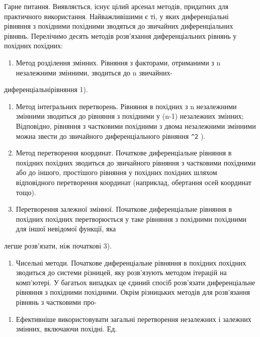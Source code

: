 \documentclass[
  ukrainian,
]{article}
\providecommand{\tightlist}{%
  \setlength{\itemsep}{0pt}\setlength{\parskip}{0pt}}
\begin{document}
Гарне питання. Виявляється, існує цілий арсенал методів, придатних для
практичного використання. Найважливішими є ті, у яких диференціальні
рівняння з похідними похідними зводяться до звичайних диференціальних
рівнянь. Перелічимо десять методів розв'язання диференціальних рівнянь у
похідних похідних:

\begin{enumerate}
\def\labelenumi{\arabic{enumi}.}
\tightlist
\item
  Метод розділення змінних. Рівняння з факторами, отриманими з n
  незалежними змінними, зводиться до n звичайних-
\end{enumerate}

диференціальнірівняння 1).

\begin{enumerate}
\def\labelenumi{\arabic{enumi}.}
\setcounter{enumi}{1}
\item
  Метод інтегральних перетворень. Рівняння в похідних з n незалежними
  змінними зводиться до рівняння з похідними у (n-1) незалежних змінних;
  Відповідно, рівняння з частковими похідними з двома незалежними
  змінними можна звести до звичайного диференціального рівняння
  \texttt{\^{}2} ).
\item
  Метод перетворення координат. Початкове диференціальне рівняння в
  похідних похідних зводиться до звичайного рівняння з частковими
  похідними або до іншого, простішого рівняння у похідних похідних
  шляхом відповідного перетворення координат (наприклад, обертання осей
  координат тощо).
\item
  Перетворення залежної змінної. Початкове диференціальне рівняння в
  похідних похідних перетворюється у таке рівняння з похідними похідними
  для іншої невідомої функції, яка
\end{enumerate}

легше розв'язати, ніж початкові 3).

\begin{enumerate}
\def\labelenumi{\arabic{enumi}.}
\setcounter{enumi}{4}
\tightlist
\item
  Чисельні методи. Початкове диференціальне рівняння в похідних похідних
  зводиться до системи різницей, яку розв'язують методом ітерацій на
  комп'ютері. У багатьох випадках це єдиний спосіб розв'язати
  диференціальне рівняння з похідними похідними. Окрім різницьких
  методів для розв'язання рівнянь з частковими про-
\end{enumerate}

\begin{enumerate}
\def\labelenumi{\alph{enumi})}
\setcounter{enumi}{4}
\tightlist
\item
  Ефективніше використовувати загальні перетворення незалежних і
  залежних змінних, включаючи похідні. Ед.
\end{enumerate}
\end{document}
